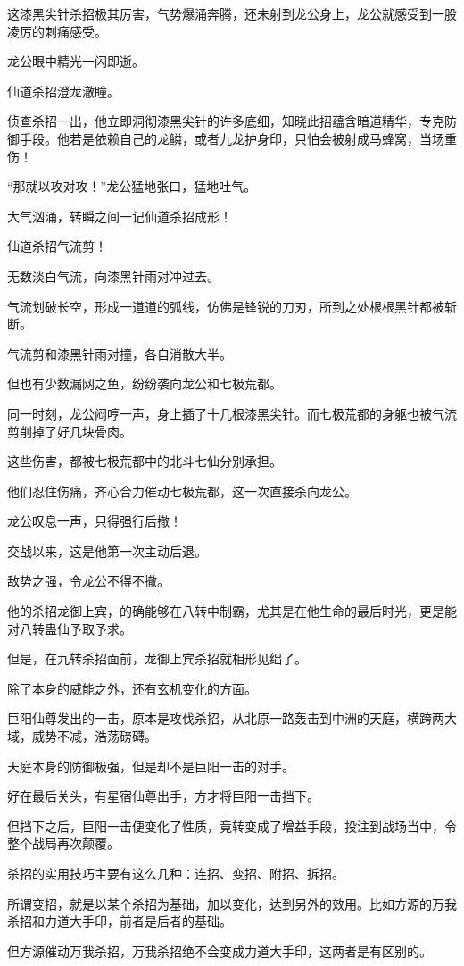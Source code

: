 \begin{this_body}
这漆黑尖针杀招极其厉害，气势爆涌奔腾，还未射到龙公身上，龙公就感受到一股凌厉的刺痛感受。

龙公眼中精光一闪即逝。

仙道杀招澄龙澈瞳。

侦查杀招一出，他立即洞彻漆黑尖针的许多底细，知晓此招蕴含暗道精华，专克防御手段。他若是依赖自己的龙鳞，或者九龙护身印，只怕会被射成马蜂窝，当场重伤！

“那就以攻对攻！”龙公猛地张口，猛地吐气。

大气汹涌，转瞬之间一记仙道杀招成形！

仙道杀招气流剪！

无数淡白气流，向漆黑针雨对冲过去。

气流划破长空，形成一道道的弧线，仿佛是锋锐的刀刃，所到之处根根黑针都被斩断。

气流剪和漆黑针雨对撞，各自消散大半。

但也有少数漏网之鱼，纷纷袭向龙公和七极荒都。

同一时刻，龙公闷哼一声，身上插了十几根漆黑尖针。而七极荒都的身躯也被气流剪削掉了好几块骨肉。

这些伤害，都被七极荒都中的北斗七仙分别承担。

他们忍住伤痛，齐心合力催动七极荒都，这一次直接杀向龙公。

龙公叹息一声，只得强行后撤！

交战以来，这是他第一次主动后退。

敌势之强，令龙公不得不撤。

他的杀招龙御上宾，的确能够在八转中制霸，尤其是在他生命的最后时光，更是能对八转蛊仙予取予求。

但是，在九转杀招面前，龙御上宾杀招就相形见绌了。

除了本身的威能之外，还有玄机变化的方面。

巨阳仙尊发出的一击，原本是攻伐杀招，从北原一路轰击到中洲的天庭，横跨两大域，威势不减，浩荡磅礴。

天庭本身的防御极强，但是却不是巨阳一击的对手。

好在最后关头，有星宿仙尊出手，方才将巨阳一击挡下。

但挡下之后，巨阳一击便变化了性质，竟转变成了增益手段，投注到战场当中，令整个战局再次颠覆。

杀招的实用技巧主要有这么几种：连招、变招、附招、拆招。

所谓变招，就是以某个杀招为基础，加以变化，达到另外的效用。比如方源的万我杀招和力道大手印，前者是后者的基础。

但方源催动万我杀招，万我杀招绝不会变成力道大手印，这两者是有区别的。


\end{this_body}
